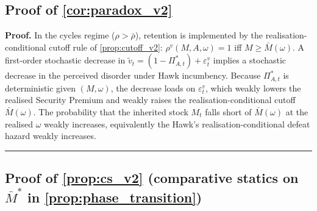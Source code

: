 \documentclass[11pt,twoside]{extarticle}
\newenvironment{proof}[1][Proof]{\noindent \textbf{#1.} }{\ \rule{0.5em}{0.5em}}
\begin{document}
\subsection*{Proof of \autoref{cor:paradox_v2}} \label{app:proof:paradox_v2}

\begin{proof}
In the cycles regime ($\rho>\bar\rho$), retention is implemented by the realisation-conditional cutoff rule of \autoref{prop:cutoff_v2}: $\rho^v(M,A,\omega)=1$ iff $M\ge\bar M(\omega)$. A first-order stochastic decrease in $\tilde v_t=(1-\Pi_{A,t}^*)+\varepsilon^v_t$ implies a stochastic decrease in the perceived disorder under Hawk incumbency. Because $\Pi_{A,t}^*$ is deterministic given $(M,\omega)$, the decrease loads on $\varepsilon^v_t$, which weakly lowers the realised Security Premium and weakly raises the realisation-conditional cutoff $\bar M(\omega)$. The probability that the inherited stock $M_t$ falls short of $\bar M(\omega)$ at the realised $\omega$ weakly increases, equivalently the Hawk's realisation-conditional defeat hazard weakly increases.
\end{proof}

\subsection*{Proof of \autoref{prop:cs_v2} (comparative statics on $\bar M^*$ in \autoref{prop:phase_transition})} \label{app:proof:cs_v2}
\end{document}
